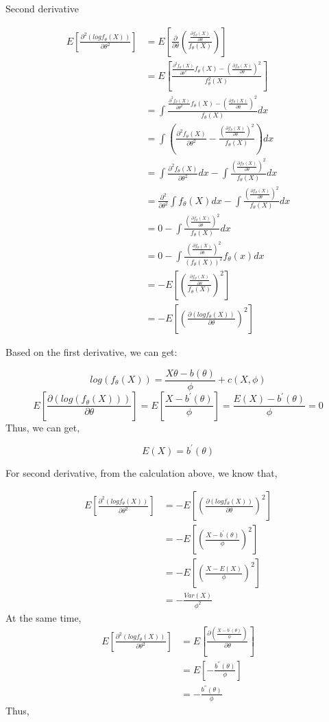 \documentclass[]{book}
\begin{document}
Second derivative

\[\begin{aligned} E[\frac{\partial^2 (logf_{\theta}(X))}{\partial \theta^2} ] &=E[ \frac{\partial}{\partial \theta}(\frac{\frac{\partial f_{\theta}(X)}{\partial \theta}}{f_{\theta}(X)})] \\  
&=E[\frac{\frac{\partial^2 f_{\theta}(X)}{\partial \theta^2}f_{\theta}(X)-(\frac{\partial f_{\theta}(X)}{\partial \theta})^2}{f^2_{\theta}(X)}] \\ &= \int \frac{\frac{\partial^2 f_{\theta}(X)}{\partial \theta^2}f_{\theta}(X)-(\frac{\partial f_{\theta}(X)}{\partial \theta})^2}{f_{\theta}(X)}dx \\ &=\int (\frac{\partial^2 f_{\theta}(X)}{\partial \theta^2} - \frac{(\frac{\partial f_{\theta}(X)}{\partial \theta})^2}{f_{\theta}(X)})dx  \\ 
&= \int \frac{\partial^2 f_{\theta}(X)}{\partial \theta^2} dx -\int \frac{(\frac{\partial f_{\theta}(X)}{\partial \theta})^2}{f_{\theta}(X)}dx \\ 
&=\frac{\partial^2}{\partial \theta^2}\int f_{\theta}(X) dx -\int \frac{(\frac{\partial f_{\theta}(X)}{\partial \theta})^2}{f_{\theta}(X)}dx \\ 
&=0-\int \frac{(\frac{\partial f_{\theta}(X)}{\partial \theta})^2}{f_{\theta}(X)}dx \\
&=0-\int \frac{(\frac{\partial f_{\theta}(X)}{\partial \theta})^2}{(f_{\theta}(X))^2}f_{\theta}(x)dx \\ &= - E[(\frac{\frac{\partial f_{\theta}(X)}{\partial \theta}}{f_{\theta}(X)})^2]\\ &= -E[(\frac{\partial (logf_{\theta}(X))}{\partial \theta})^2] \end{aligned}\]

Based on the first derivative, we can get:

\[log(f_{\theta}(X))=\frac{X\theta-b(\theta)}{\phi}+c(X,\phi)\]
\[E[\frac{\partial (log(f_{\theta}(X)))}{\partial \theta}]= E[\frac{X-b^{'}(\theta)}{\phi}]=\frac{E(X)-b^{'}(\theta)}{\phi}=0\]
Thus, we can get,

\[E(X)=b^{'}(\theta)\]

For second derivative, from the calculation above, we know that,

\[\begin{aligned} E[\frac{\partial^2 (logf_{\theta}(X))}{\partial \theta^2}]&=-E[(\frac{\partial (logf_{\theta}(X))}{\partial \theta})^2] \\ &= -E[(\frac{X-b^{'}(\theta)}{\phi})^2]\\ &=-E[(\frac{X-E(X)}{\phi})^2] \\ &= -\frac{Var(X)}{\phi^2}\end{aligned}\]
At the same time,
\[\begin{aligned} E[\frac{\partial^2 (logf_{\theta}(X))}{\partial \theta^2}]&=E[\frac{\partial (\frac{X-b^{'}(\theta)}{\phi})}{\partial \theta}] \\ &= E[-\frac{b^{''}(\theta)}{\phi}]\\ &= - \frac{b^{''}(\theta)}{\phi} \end{aligned}\]
Thus,
\end{document}
